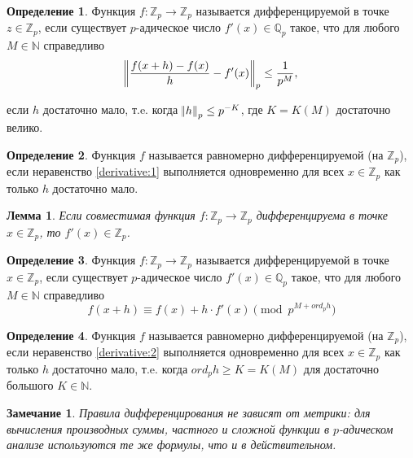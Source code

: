 \documentclass[och, master]{SCWorks}
\theoremstyle{plain}
\theoremstyle{plain}
\newtheorem{lemma}{Лемма}
\theoremstyle{plain}
\newtheorem{note}{Замечание}
\theoremstyle{definition}
\newtheorem{defn}{Определение}
\begin{document}
\begin{defn}
Функция $f:\mathbb {Z}_p \rightarrow \mathbb {Z}_p$ называется дифференцируемой в точке $z \in \mathbb {Z}_p$, если существует $p$-адическое число $f'(x) \in \mathbb {Q}_p$ такое, что для любого $M \in \mathbb {N}$ справедливо
\begin{equation} \label{derivative:1}
	\norm{\frac{f(x+h)-f(x)}{h} - f'(x)}_p \le \frac{1}{p^M},
\end{equation}

\noindent если $h$ достаточно мало, т.e. когда $\norm{h}_p \le p^{-K}$, где $K=K(M)$ достаточно велико.
\end{defn}

\begin{defn}
Функция $f$ называется равномерно дифференцируемой (на $\mathbb {Z}_p$), если неравенство \eqref{derivative:1} выполняется одновременно для всех $x \in \mathbb {Z}_p$ как только $h$ достаточно мало. \cite{bib:analysis:anashin:en}
\end{defn}

\begin{lemma}
Если совместимая функция $f:\mathbb {Z}_p \rightarrow \mathbb {Z}_p$ дифференцируема в точке $x \in \mathbb {Z}_p$, то $f'(x) \in \mathbb {Z}_p$.
\end{lemma}

\begin{defn}
Функция $f:\mathbb {Z}_p \rightarrow \mathbb {Z}_p$ называется дифференцируемой в точке $x \in \mathbb {Z}_p$, если существует $p$-адическое число $f'(x) \in \mathbb {Q}_p$ такое, что для любого $M \in \mathbb {N}$ справедливо
\begin{equation} \label{derivative:2}
	f(x+h) \equiv f(x) + h \cdot f'(x) \pmod p^{M + ord_p h}
\end{equation}
\end{defn}

\begin{defn}
Функция $f$ называется равномерно дифференцируемой (на $\mathbb {Z}_p$), если неравенство \eqref{derivative:2} выполняется одновременно для всех $x \in \mathbb {Z}_p$ как только $h$ достаточно мало, т.e. когда $ord_p h \ge K=K(M)$ для достаточно большого $K \in \mathbb {N}$.
\end{defn}

\begin{note}
Правила дифференцирования не зависят от метрики: для вычисления производных суммы, частного и сложной функции в $p$-адическом анализе используются те же формулы, что и в действительном.
\end{note}
\end{document}
